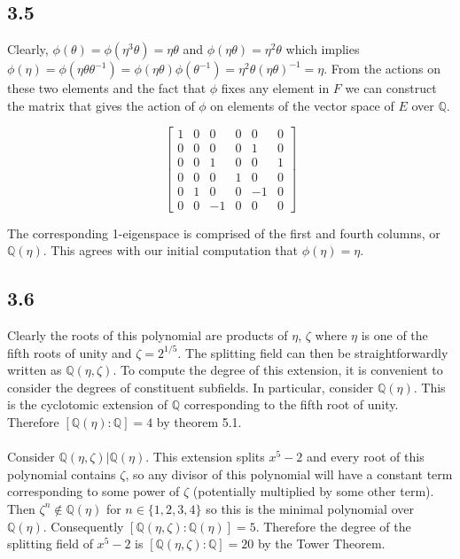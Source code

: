 \documentclass{article}
\begin{document}
\subsection*{3.5}
Clearly, $\phi(\theta) = \phi(\eta^3\theta) = \eta\theta$ and $\phi(\eta\theta) = \eta^2\theta$ 
which implies $\phi(\eta) = \phi(\eta\theta\theta^{-1}) = \phi(\eta\theta)\phi(\theta^{-1}) = \eta^2\theta(\eta\theta)^{-1} = \eta$. From the actions on these two 
elements and the fact that $\phi$ fixes any element in $F$ we can construct the matrix that gives 
the action of $\phi$ on elements of the vector space of $E$ over $\mathbb{Q}$.

\begin{equation*}
	\begin{bmatrix}
		1 & 0 & 0 & 0 & 0 & 0\\
		0 & 0 & 0 & 0 & 1 & 0\\
		0 & 0 & 1 & 0 & 0 & 1\\
		0 & 0 & 0 & 1 & 0 & 0\\
		0 & 1 & 0 & 0 & -1 & 0\\
		0 & 0 & -1 & 0 & 0 & 0 
	\end{bmatrix}
\end{equation*}

The corresponding 1-eigenspace is comprised of the first and fourth columns, or $\mathbb{Q}(\eta)$. This 
agrees with our initial computation that $\phi(\eta) = \eta$.

\subsection*{3.6}
Clearly the roots of this polynomial are products of $\eta$, $\zeta$ where $\eta$ is one of the 
fifth roots of unity and $\zeta = 2^{1/5}$. The splitting field can then be straightforwardly written 
as $\mathbb{Q}(\eta,\zeta)$. To compute the degree of this extension, it is convenient to 
consider the degrees of constituent subfields. In particular, consider $\mathbb{Q}(\eta)$. 
This is the cyclotomic extension of $\mathbb{Q}$ corresponding to the fifth root of 
unity. Therefore $[\mathbb{Q}(\eta):\mathbb{Q}] = 4$ by theorem 5.1. 

\paragraph{}
Consider $\mathbb{Q}(\eta,\zeta)|\mathbb{Q}(\eta)$. This extension splits $x^5 -2$ and every root of 
this polynomial contains $\zeta$, so any divisor of this polynomial will have a constant term 
corresponding to some power of $\zeta$ (potentially multiplied by some other term). Then $\zeta^n \notin \mathbb{Q}(\eta)$ for $n \in \{1,2,3,4\}$ 
so this is the minimal polynomial over $\mathbb{Q}(\eta)$. Consequently 
$[\mathbb{Q}(\eta,\zeta):\mathbb{Q}(\eta)] = 5$. Therefore the degree of the splitting field of 
$x^5 -2$ is $[\mathbb{Q}(\eta,\zeta):\mathbb{Q}] = 20$ by the Tower Theorem.
\end{document}
